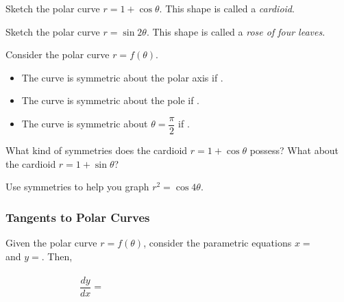 \documentclass[notes]{subfiles}
\begin{document}
		\begin{ex}
			Sketch the polar curve $r = 1 + \cos\theta$.  This shape is called a \emph{cardioid}.
		\end{ex}
			
		\begin{ex}
			Sketch the polar curve $r = \sin 2\theta$.  This shape is called a \emph{rose of four leaves}.
		\end{ex}
			\newpage
			
		\begin{rmk}
			Consider the polar curve $r = f(\theta)$. 
			\begin{itemize}
				\setlength \itemsep{20pt}
				\item The curve is symmetric about the polar axis if .
				\item The curve is symmetric about the pole if .
				\item The curve is symmetric about $\theta = \dfrac{\pi}{2}$ if .
			\end{itemize}
		\end{rmk}
		
		\begin{ex}
			What kind of symmetries does the cardioid $r = 1 + \cos\theta$ possess?  What about the cardioid $r = 1+\sin\theta$?
		\end{ex}
			
		\begin{ex}
			Use symmetries to help you graph $r^2 = \cos 4\theta$.
		\end{ex}
			\newpage
			
	\subsubsection*{Tangents to Polar Curves}
		\begin{rmk}
			Given the polar curve $r = f(\theta)$, consider the parametric equations $x = $\\[20pt] and $y = $.  Then, \\ \\
				\[\dfrac{dy}{dx} = \hspace{3in}\]
		\end{rmk}
		\begin{pf}
		
		\end{pf}
			\vspace{1.5in}
			
\end{document}

